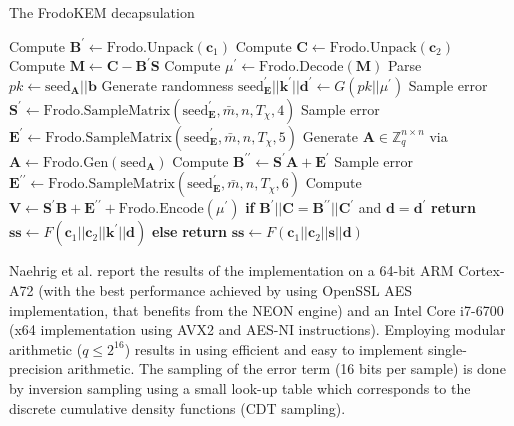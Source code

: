 \begin{algorithm}
\caption{The \textsf{FrodoKEM} decapsulation} \label{alg:decaps}
  \begin{algorithmic}[1]
        \State Compute $\mathbf{B}^\prime \leftarrow \text{Frodo.Unpack}(\mathbf{c}_1)$
        \State Compute $\mathbf{C} \leftarrow \text{Frodo.Unpack}(\mathbf{c}_2)$
        \State Compute $\mathbf{M} \leftarrow \mathbf{C} - \mathbf{B}^\prime \mathbf{S}$        
        \State Compute $\mu^\prime \leftarrow \text{Frodo.Decode}(\mathbf{M})$   
        \State Parse $pk \leftarrow \text{seed}_\mathbf{A} || \mathbf{b}$
        \State Generate randomness $\text{seed}^\prime_\mathbf{E} || \mathbf{k}^\prime ||\mathbf{d}^\prime \leftarrow G(pk || \mu^\prime)$       
       \State Sample error $\mathbf{S}^\prime \leftarrow \text{Frodo.SampleMatrix}(\text{seed}^\prime _\mathbf{E},\bar{m},n,T_\chi,4)$
       \State Sample error $\mathbf{E}^\prime \leftarrow \text{Frodo.SampleMatrix}(\text{seed}^\prime _\mathbf{E},\bar{m},n,T_\chi,5)$
        \State Generate $\mathbf{A} \in \mathbb{Z}^{n \times n}_{q}$ via $\mathbf{A} \leftarrow \text{Frodo.Gen}(\text{seed}_\mathbf{A})$
        \State Compute $\mathbf{B}^{\prime\prime} \leftarrow \mathbf{S}^\prime \mathbf{A} + \mathbf{E}^\prime$ \label{alg:lwe}
        \State Sample error $\mathbf{E}^{\prime\prime} \leftarrow \text{Frodo.SampleMatrix}(\text{seed}^\prime_\mathbf{E},\bar{m},n,T_\chi,6    )$
        \State Compute $\mathbf{V} \leftarrow \mathbf{S}^\prime \mathbf{B} + \mathbf{E} ^{\prime\prime} + \text{Frodo.Encode}(\mu^\prime)$
\State \textbf{if} $ \mathbf{B}^\prime || \mathbf{C} = \mathbf{B}^{\prime\prime} || \mathbf{C}^\prime$ and $\mathbf{d} = \mathbf{d}^\prime $ \textbf{return} $\mathbf{ss} \leftarrow F(\mathbf{c}_1 || \mathbf{c}_2 || \mathbf{k}^\prime || \mathbf{d})$
	 \State \textbf{else} \textbf{return} $\mathbf{ss} \leftarrow F(\mathbf{c}_1 || \mathbf{c}_2 || \mathbf{s} || \mathbf{d})$
    \EndProcedure
\end{algorithmic}
 \end{algorithm}

\vspace{-0.55cm}

Naehrig et al. \cite{frodokem} report the results of the implementation on a 64-bit ARM Cortex-A72 (with the best performance achieved by using OpenSSL AES implementation, that benefits from the NEON engine) and an Intel Core i7-6700 (x64 implementation using AVX2 and AES-NI instructions). Employing modular arithmetic ($q \leq 2^{16}$) results in using efficient and easy to implement single-precision arithmetic. The sampling of the error term (16 bits per sample) is done by inversion sampling using a small look-up table which corresponds to the discrete cumulative density functions (CDT sampling).

